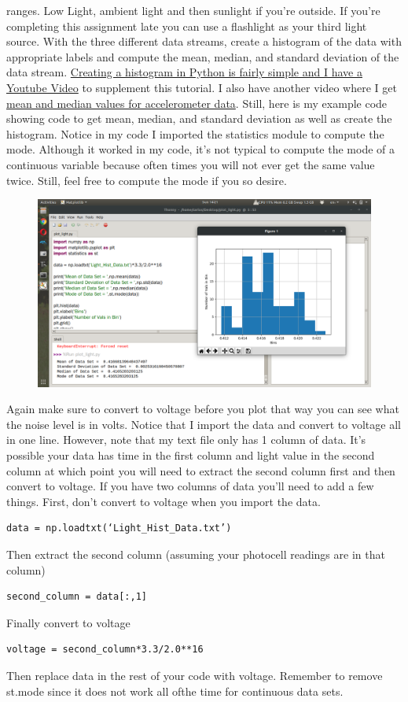 ranges. Low Light, ambient light and then sunlight if you're
outside. If you're completing this assignment late you can use a
flashlight as your third light source. With the three
different data streams, create a histogram of the data with
appropriate labels and compute the mean, median, and standard
deviation of the data
stream. \href{https://www.youtube.com/watch?v=bfeJfAWTqzY&list=PL_D7_GvGz-v1RsDs_OdNW65qRjEjmpfQx&index=22&t=0s}{Creating
a histogram in Python is fairly simple and I have a Youtube Video} to
supplement this tutorial. I also have another video where I
get \href{https://www.youtube.com/watch?v=e4xs9Ky7_YI&list=PL_D7_GvGz-v1RsDs_OdNW65qRjEjmpfQx&index=20&t=0s}{mean
and median values for accelerometer data}. Still, here is my example
code showing code to get mean, median, and standard deviation as well
as create the histogram. Notice in my code I imported the statistics
module to compute the mode. Although it worked in my code, it’s not
typical to compute the mode of a continuous variable because often
times you will not ever get the same value twice. Still, feel free to
compute the mode if you so desire. 
\begin{figure}[H]
  \begin{center}
    \includegraphics[width=\textwidth]{Figures/histogram.png}
  \end{center}
\end{figure}
Again make sure to convert to voltage before you plot that way you can see what the noise level is in volts. Notice that I import the data and convert to voltage all in one line. However, note that my text file only has 1 column of data. It’s possible your data has time in the first column and light value in the second column at which point you will need to extract the second column first and then convert to voltage. If you have two columns of data you’ll need to add a few things. First, don’t convert to voltage when you import the data.
\begin{verbatim}
data = np.loadtxt(‘Light_Hist_Data.txt’)
\end{verbatim}
Then extract the second column (assuming your photocell readings are in that column)
\begin{verbatim}
second_column = data[:,1]
\end{verbatim}
Finally convert to voltage
\begin{verbatim}
voltage = second_column*3.3/2.0**16
\end{verbatim}
Then replace data in the rest of your code with voltage. Remember to remove st.mode since it does not work all ofthe time for continuous data sets. 
